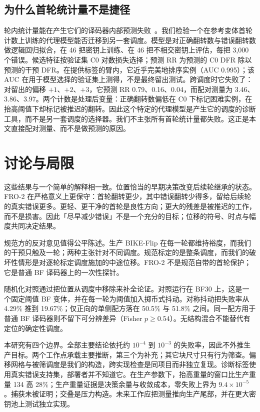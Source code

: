 \documentclass[UTF8,a4paper,10pt,twocolumn]{ctexart}
\begin{document}
\subsection{为什么首轮统计量不是捷径}\label{sec:counterfactual}

轮内统计量能在产生它们的译码器内部预测失败~\cite{kim2021logistic,paiva2022pickyfix}。我们检验一个在参考变体首轮计数上训练的代理模型能否迁移到另一套调度。模型是对正确翻转数与错误翻转数做逻辑回归拟合，在 46 把密钥上训练、在 46 把不相交密钥上评估，每把 3,000 个错误。候选特征按验证集 C0 对数损失选择；预测 RR 为预测的 C0 DFR 除以预测的干预 DFR。在提供标签的臂内，它近乎完美地排序实例（AUC 0.995）；该 AUC 在用于模型选择的验证集上测得，不是最终留出测试。跨调度时它失败了：对留出的偏移 $+1$、$+2$、$+3$，它预测 RR 0.79、0.16、0.04，而配对测量为 3.46、3.86、3.97。两个计数是处理后变量：正确翻转数偏低在 C0 下标记困难实例，在抬高阈值下却标记被推迟的翻转。因此这个特定的代理模型是产生它的调度的诊断工具，而不是另一套调度的选择器。我们不主张所有首轮统计量都失败。这正是本文直接配对测量、而不是做预测的原因。
\section{讨论与局限}\label{sec:discussion}

这些结果与一个简单的解释相一致。位置恰当的早期决策改变后续轮继承的状态。FRO-2 在严格意义上更保守：首轮翻转更少，其中错误翻转少得多，留给后续轮的真实错误更多。更轻、更干净的首轮是良性方向；更大的残差是被推迟的工作，而不是损害。因此「尽早减少错误」不是一个充分的目标；位移的符号、时点与幅度共同决定结果。

规范方的反对意见值得公平陈述。生产 BIKE-Flip 在每一轮都维持裕度，而我们的干预只触及一轮；两种主张针对不同调度。规范标定的是整条调度，而我们的破坏性情形是对逐轮标定调度施加的中途位移。FRO-2 不是规范自带的首轮保护；它是普通 BF 译码器上的一次性探针。

随机化对照通过把位置从调度中移除来补全论证。对照运行在 BF30 上，这是一个固定阈值 BF 变体，并在每一轮为阈值加入掷币式抖动。对称抖动把失败率从 4.29\% 推到 19.67\%；仅正向的单侧配方落在 50.5\% 与 51.8\% 之间。同一配方用于普通 BF 译码器则不留下可分辨差异（Fisher $p\ge0.54$）。无结构混合不能替代有定位的确定性调度。

本研究有四个边界。全部主要结论依托约 $10^{-4}$ 到 $10^{-3}$ 的失败率，因此不外推生产目标。两个工作点承载主要推断，第三个为补充；其它块尺寸只有行为筛查。偏移网格与被筛调度是我们的构造，跨实现检查是同项目而非独立复现。诊断标签使用真实错误支持集，部署者并不知道它。在生产参数下，抬高重量的窗口比生产重量 134 高 28\%；生产重量证据是决策余量与收敛成本，零失败上界为 $9.4\times10^{-5}$。捕获未被证明；交叠是压力构造。未来工作应把测量推向生产尾部，并在更大密钥池上测试独立实现。
\end{document}
